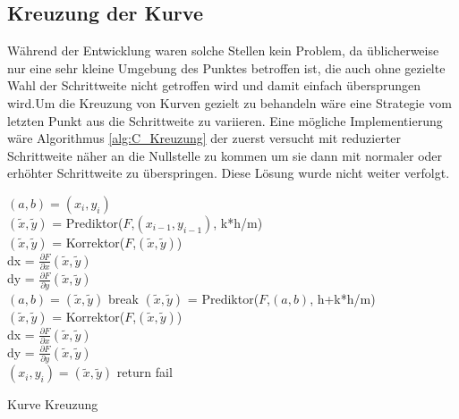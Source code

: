\documentclass[a4paper,11pt,bibliography=totoc,listof=totoc,headinclude=true,cleardoublepage=empty,oneside]{scrartcl}
\newcommand{\diff}[2]{\frac{\partial #1}{\partial #2}}
\begin{document}
\subsection{Kreuzung der Kurve}  
Während der Entwicklung waren solche Stellen kein Problem, da üblicherweise nur eine sehr kleine Umgebung des Punktes betroffen ist, die auch ohne gezielte Wahl der Schrittweite nicht getroffen wird und damit einfach übersprungen wird.Um die Kreuzung von Kurven gezielt zu behandeln wäre eine Strategie vom letzten Punkt aus die Schrittweite zu variieren. Eine mögliche Implementierung wäre Algorithmus \ref{alg:C_Kreuzung} der zuerst versucht mit reduzierter Schrittweite näher an die Nullstelle zu kommen um sie dann mit normaler oder erhöhter Schrittweite zu überspringen.
Diese Lösung wurde nicht weiter verfolgt.\\
\begin{algorithm}[H]
	\label{alg:C_Kreuzung}
	$(a,b) = (x_i,y_i)$\\
	{
		$(\tilde x, \tilde y)$ = Prediktor($F$,$(x_{i-1},y_{i-1})$, k*h/m)\\
		$(\tilde x, \tilde y)$ = Korrektor($F$,$(\tilde x, \tilde y)$)\\		
		dx = $\diff{F}{x}(\tilde x, \tilde y)$\\
		dy = $\diff{F}{y}(\tilde x, \tilde y)$\\
		{
			$(a,b) = (\tilde x, \tilde y)$	
		}
		{
			break
		}
	}
	{
		$(\tilde x, \tilde y)$ = Prediktor($F$,$(a,b)$, h+k*h/m)\\
		$(\tilde x, \tilde y)$ = Korrektor($F$,$(\tilde x, \tilde y)$)\\		
		dx = $\diff{F}{x}(\tilde x, \tilde y)$\\
		dy = $\diff{F}{y}(\tilde x, \tilde y)$\\
		{
			$(x_i,y_i) = (\tilde x, \tilde y)$	
			return
		}
	}
	fail
	\caption{Kurve Kreuzung}
\end{algorithm}
\end{document}
